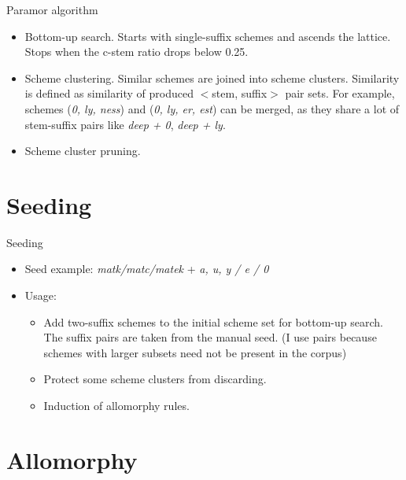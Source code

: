 \documentclass[hyperref={pdfencoding=unicode, unicode=true}]{beamer}
\begin{document}
\begin{frame}{Paramor algorithm}
\begin{itemize}
\item Bottom-up search. Starts with single-suffix schemes and ascends the lattice. Stops when the c-stem ratio drops below 0.25.
\item Scheme clustering. Similar schemes are joined into scheme clusters. Similarity is defined as similarity of produced $<$stem, suffix$>$ pair sets. For example, schemes (\emph{0, ly, ness}) and (\emph{0, ly, er, est}) can be merged, as they share a lot of stem-suffix pairs like \emph{deep + 0}, \emph{deep + ly}.
\item Scheme cluster pruning.
\end{itemize}
\end{frame}

\section{Seeding}

\begin{frame}{Seeding}
\begin{itemize}
\item Seed example: \emph{matk/matc/matek} + \emph{a, u, y / e / 0}
\item Usage: \begin{itemize}
    \item Add two-suffix schemes to the initial scheme set for bottom-up search. The suffix pairs are taken from the manual seed. (I use pairs because schemes with larger subsets need not be present in the corpus)
    \item Protect some scheme clusters from discarding.
    \item Induction of allomorphy rules.
\end{itemize}
\end{itemize}
\end{frame}

\section{Allomorphy}
\end{document}
